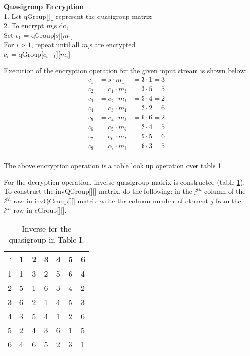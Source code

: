 \documentclass[conference]{IEEEtran}
\begin{document}
\noindent\textbf{Quasigroup Encryption}\\
  \hspace*{1em} 1. Let qGroup[][] represent the quasigroup matrix\\
  \hspace*{1em} 2. To encrypt $m_i$s do,\\
  \hspace*{3em} Set $c_1$ = qGroup[$s$][$m_1$]\\
  \hspace*{3em} For $i>1$, repeat until all $m_i$s are encrypted\\
  \hspace*{4em} $c_i$ = qGroup[$c_{i-1}$][$m_i$]

Execution of the encryption operation for the given input stream is shown below:
\begin{displaymath}
\begin{array}{rcl}
c_1 & = s \cdot m_1  &= 3\cdot 1 = 3 \\
c_2 & = c_1 \cdot m_2 &= 3\cdot 5 = 5 \\
c_3 & = c_2 \cdot m_3 &= 5\cdot 4 = 2 \\
c_4 & = c_3 \cdot m_4 &= 2\cdot 2 = 6 \\
c_5 & = c_4 \cdot m_5 &= 6\cdot 6 = 2 \\
c_6 & = c_5 \cdot m_6 &= 2\cdot 4 = 5 \\
c_7 & = c_6 \cdot m_7 &= 5\cdot 5 = 6 \\
c_8 & = c_7 \cdot m_8 &= 6\cdot 3 = 5 \\
\end{array}
\end{displaymath}

The above encryption operation is a table look up operation over table 1.

For the decryption operation, inverse quasigroup matrix is constructed (table \ref{tab:inverseQG}). To construct the invQGroup[][] matrix, do the following: in the $j^{th}$ column of the $i^{th}$ row in invQGroup[][] matrix write the column number of element $j$ from the $i^{th}$ row in qGroup[][].

\begin{table}
\centering
\begin{tabular}{|r|l|l|l|l|l|l|}
\hline
$\cdot$& 1&  2&  3&  4&  5&  6\\ \hline
1& 1&  3&  2&  5&  6&  4\\ \hline
2& 5&  1&  6&  3&  4&  2\\ \hline
3& 6&  2&  1&  4&  5&  3\\ \hline
4& 3&  5&  4&  1&  2&  6\\ \hline
5& 2&  4&  3&  6&  1&  5\\ \hline
6& 4&  6&  5&  2&  3&  1\\ \hline
\end{tabular}
\caption{Inverse for the quasigroup in Table I.}
\vspace{-0.28in}
\label{tab:inverseQG}
\end{table}
\end{document}
